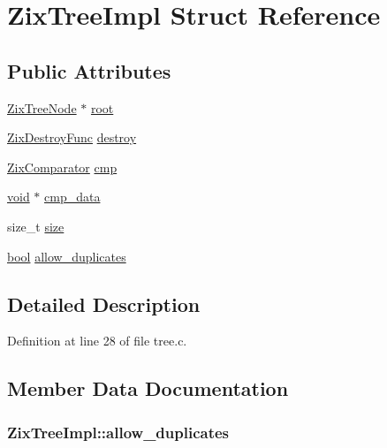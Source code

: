 \hypertarget{struct_zix_tree_impl}{}\section{Zix\+Tree\+Impl Struct Reference}
\label{struct_zix_tree_impl}
\subsection*{Public Attributes}
\begin{DoxyCompactItemize}
\item 
\hyperlink{lilv_2src_2zix_2tree_8c_ab32839211c3f44b0a4ca3a90aec422a7}{Zix\+Tree\+Node} $\ast$ \hyperlink{struct_zix_tree_impl_a522be29cf68bdc11adcd5c25e7981b82}{root}
\item 
\hyperlink{group__zix_ga116fe3bb614b937a4190ab5fe645cc87}{Zix\+Destroy\+Func} \hyperlink{struct_zix_tree_impl_a6f53e3cc67e3e21b1ae5fdb3f806e5ce}{destroy}
\item 
\hyperlink{group__zix_gaa647997c2e16e85391dad2d77c02aff6}{Zix\+Comparator} \hyperlink{struct_zix_tree_impl_aef1a98f4e324607032aee1c36df03b75}{cmp}
\item 
\hyperlink{sound_8c_ae35f5844602719cf66324f4de2a658b3}{void} $\ast$ \hyperlink{struct_zix_tree_impl_ab10c6c1d17a2c6ed6285fb071679c169}{cmp\+\_\+data}
\item 
size\+\_\+t \hyperlink{struct_zix_tree_impl_ab95a2d9063598f768d431bc9aba370ec}{size}
\item 
\hyperlink{mac_2config_2i386_2lib-src_2libsoxr_2soxr-config_8h_abb452686968e48b67397da5f97445f5b}{bool} \hyperlink{struct_zix_tree_impl_af78a97c1d61004a7407b21ea07e26842}{allow\+\_\+duplicates}
\end{DoxyCompactItemize}


\subsection{Detailed Description}


Definition at line 28 of file tree.\+c.



\subsection{Member Data Documentation}
\subsubsection[{\texorpdfstring{allow\+\_\+duplicates}{allow_duplicates}}]{ Zix\+Tree\+Impl\+::allow\+\_\+duplicates}\hypertarget{struct_zix_tree_impl_af78a97c1d61004a7407b21ea07e26842}{}\label{struct_zix_tree_impl_af78a97c1d61004a7407b21ea07e26842}


